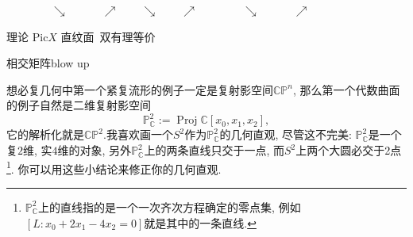 \documentclass[UTF8,12pt,twoside]{article}
\theoremstyle{definition}
\newcommand{\CC}{\mathbb{C}}  %
\newcommand{\Proj}{\operatorname{Proj}}
\numberwithin{equation}{section}
\begin{document}
$\quad\quad\quad\quad\searrow\quad\quad\quad\nearrow\quad\quad\searrow \quad\quad\nearrow\quad\quad\quad\quad
\searrow\quad\quad\quad \nearrow $

理论\quad\quad\quad\; $\mathrm{Pic}X$\quad\quad\quad\;\; 直纹面\quad\quad\quad\quad\, 双有理等价

\quad\quad\quad\quad\;
相交矩阵\quad\quad\quad\quad\quad\quad\quad\quad\quad\quad\quad blow up



想必复几何中第一个紧复流形的例子一定是复射影空间$\mathbb{CP}^n$, 那么第一个代数曲面的例子自然是二维复射影空间
$$\mathbb{P}_{\CC}^2:= \Proj \CC[x_0,x_1,x_2], $$
它的解析化就是$\mathbb{CP}^2$.我喜欢画一个$S^2$作为$\mathbb{P}_{\CC}^2$的几何直观, 尽管这不完美: $\mathbb{P}_{\CC}^2$是一个复$2$维, 实$4$维的对象, 另外$\mathbb{P}_{\CC}^2$上的两条直线只交于一点, 而$S^2$上两个大圆必交于2点\footnote{$\mathbb{P}_{\CC}^2$上的直线指的是一个一次齐次方程确定的零点集, 例如$[L:x_0+2x_1-4x_2=0]$就是其中的一条直线.}. 你可以用这些小结论来修正你的几何直观.
\end{document}
